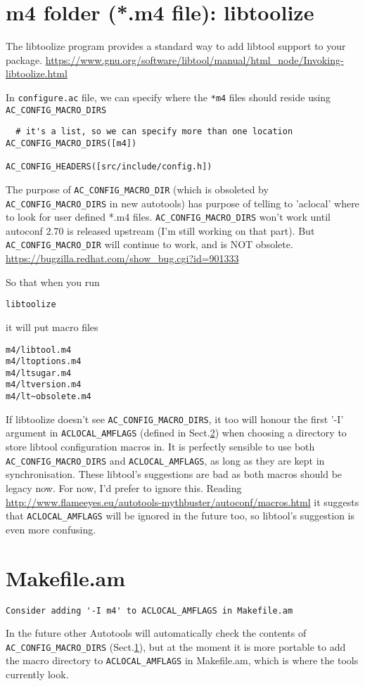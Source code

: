 \section{m4 folder (*.m4 file): libtoolize}
\label{sec:libtoolize}
\label{sec:AC_CONFIG_MACRO_DIR}

The libtoolize program provides a standard way to add libtool support to your
package.
\url{https://www.gnu.org/software/libtool/manual/html_node/Invoking-libtoolize.html}

In \verb!configure.ac! file, we can specify where the \verb!*m4! files should
reside using \verb!AC_CONFIG_MACRO_DIRS!
\begin{verbatim}
  # it's a list, so we can specify more than one location
AC_CONFIG_MACRO_DIRS([m4])

AC_CONFIG_HEADERS([src/include/config.h])
\end{verbatim}
The purpose of \verb!AC_CONFIG_MACRO_DIR! (which is obsoleted by
\verb!AC_CONFIG_MACRO_DIRS! in new autotools) has purpose of telling to
'aclocal' where to look for user defined  *.m4 files.
\verb!AC_CONFIG_MACRO_DIRS! won't work until autoconf 2.70 is released upstream
(I'm still working on that part).  But \verb!AC_CONFIG_MACRO_DIR! will continue
to work, and is NOT obsolete.
\url{https://bugzilla.redhat.com/show_bug.cgi?id=901333}

So that when you run
\begin{verbatim}
libtoolize
\end{verbatim}
it will put macro files
\begin{verbatim}
m4/libtool.m4
m4/ltoptions.m4
m4/ltsugar.m4
m4/ltversion.m4
m4/lt~obsolete.m4
\end{verbatim}

If libtoolize doesn't see \verb!AC_CONFIG_MACRO_DIRS!, it too will honour the
first '-I' argument in \verb!ACLOCAL_AMFLAGS! (defined in
Sect.\ref{sec:Makefile.am}) when choosing a directory to store libtool
configuration macros in. It is perfectly sensible to use both
\verb!AC_CONFIG_MACRO_DIRS! and \verb!ACLOCAL_AMFLAGS!, as long as they are kept
in synchronisation. These libtool's suggestions are bad as both macros should be
legacy now.  For now, I'd prefer to ignore this.
Reading \url{http://www.flameeyes.eu/autotools-mythbuster/autoconf/macros.html}
it suggests that \verb!ACLOCAL_AMFLAGS! will be ignored in the future too, so
libtool's suggestion is even more confusing.


\section{Makefile.am}
\label{sec:Makefile.am}

\begin{verbatim}
Consider adding '-I m4' to ACLOCAL_AMFLAGS in Makefile.am
\end{verbatim}

In the future other Autotools will automatically check the contents of
\verb!AC_CONFIG_MACRO_DIRS! (Sect.\ref{sec:libtoolize}), but at the moment it is
more portable to add the macro directory to \verb!ACLOCAL_AMFLAGS! in
Makefile.am, which is where the tools currently look. 


